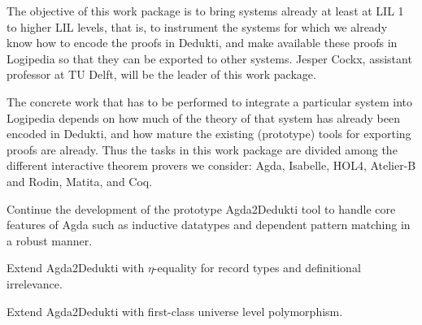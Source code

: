 \begin{workpackage}[id=instrumentation,type=RTD,wphases=1-48,
  short=Integration,%
  title=Integration,
  lead=Del,
  DelRM=14,
  GotRM=4,
  TumRM=5,
  ChaRM=16,
  CleRM=14,
  ImtRM=1,
  TouRM=11,
  BolRM=16, %
  InrRM=6]

\begin{wpobjectives}
  The objective of this work package is to bring systems already at least at
  LIL 1 to higher LIL levels, that is, to instrument the systems
  for which we already know how to encode the proofs in Dedukti, and
  make available these proofs in Logipedia so that
  they can be exported to other systems.
  Jesper Cockx, assistant professor at TU Delft, will be the leader of
  this work package.
\end{wpobjectives}

\begin{wpdescription}
  The concrete work that has to be performed to integrate a particular
  system into Logipedia depends on how much of the theory of that
  system has already been encoded in Dedukti, and how mature the
  existing (prototype) tools for exporting proofs are already. Thus
  the tasks in this work package are divided among the different
  interactive theorem provers we consider: Agda, Isabelle, HOL4,
  Atelier-B and Rodin, Matita, and Coq.
\end{wpdescription}

\begin{tasklist}
\begin{task}[id=agda,
  title=Instrument Agda,
  lead=Del,
  DelRM=14,
  GotRM=4,
  wphases=1-18]
% 
\begin{compactitem}
\item Continue the development of the prototype Agda2Dedukti tool to
handle core features of Agda such as inductive datatypes and dependent
pattern matching in a robust manner.
\item Extend Agda2Dedukti with $\eta$-equality for record types and definitional irrelevance.
\item Extend Agda2Dedukti with first-class universe level polymorphism.
\end{compactitem}
\end{task}


\end{tasklist}
\end{workpackage}
